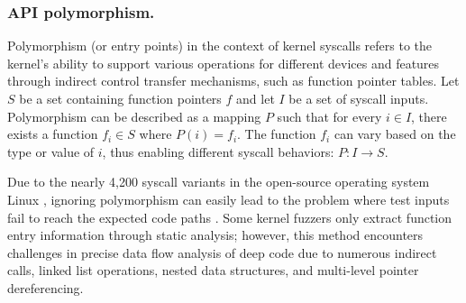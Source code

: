 \subsubsection{API polymorphism.}
Polymorphism (or entry points) in the context of kernel syscalls refers to the kernel's ability to support various operations for different devices and features through indirect control transfer mechanisms, such as function pointer tables. Let \( S \) be a set containing function pointers \( f \) and let \( I \) be a set of syscall inputs. Polymorphism can be described as a mapping \( P \) such that for every \( i \in I \), there exists a function \( f_i \in S \) where \( P(i) = f_i \). The function \( f_i \) can vary based on the type or value of \( i \), thus enabling different syscall behaviors: \( P: I \to S \).

Due to the nearly 4,200 syscall variants in the open-source operating system Linux \cite{Syzkaller}, ignoring polymorphism can easily lead to the problem where test inputs fail to reach the expected code paths \cite{jeong2019razzer,schumilo2017kafl}. Some kernel fuzzers \cite{pailoor2018moonshine,han2017imf,2017DIFUZE} only extract function entry information through static analysis; however, this method encounters challenges in precise data flow analysis of deep code due to numerous indirect calls, linked list operations, nested data structures, and multi-level pointer dereferencing. 


